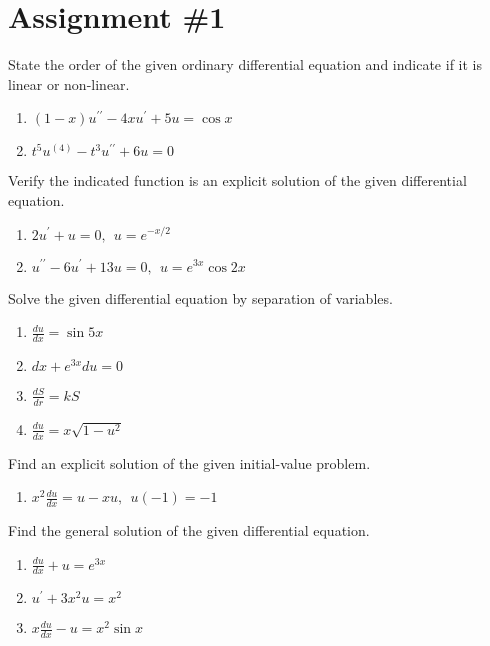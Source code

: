 \chapter{Assignment \#1}
\label{ch:ass1}
\begin{fullwidth}

State the order of the given ordinary differential equation and indicate if it is linear or non-linear.

\begin{enumerate}
\item $\left(1-x\right)u^{\prime \prime}-4xu^{\prime} + 5u = \cos{x}$
\vspace{1.0cm}
\item $t^5u^{(4)}-t^3u^{\prime \prime}+6u=0$
\vspace{1.0cm}
\end{enumerate}

\noindent Verify the indicated function is an explicit solution of the given differential equation.
\begin{enumerate}[resume]
\item $2u^{\prime}+u=0, \ \ u=e^{-x/2}$
\vspace{1.0cm}
\item $u^{\prime \prime} - 6u^{\prime}+13u=0, \ \ u=e^{3x}\cos{2x}$
\vspace{1.0cm}
\end{enumerate}

\noindent Solve the given differential equation by separation of variables.
\begin{enumerate}[resume]
\item $\frac{du}{dx}=\sin{5x}$
\vspace{1.0cm}
\item $dx + e^{3x}du = 0$
\vspace{1.0cm}
\item $\frac{dS}{dr} = kS$
\vspace{1.0cm}
\item $\frac{du}{dx} = x\sqrt{1-u^2}$
\vspace{1.0cm}
\end{enumerate}

\noindent Find an explicit solution of the given initial-value problem.
\begin{enumerate}[resume]
\item $x^2 \frac{du}{dx}=u-xu, \ \ u(-1)=-1$
\vspace{1.0cm}
\end{enumerate}

\noindent Find the general solution of the given differential equation.
\begin{enumerate}[resume]
\item $\frac{du}{dx} + u = e^{3x}$
\vspace{1.0cm}
\item $u^{\prime} + 3x^2u = x^2$
\vspace{1.0cm}
\item $x\frac{du}{dx}-u=x^2\sin{x}$
\end{enumerate}

\end{fullwidth}

